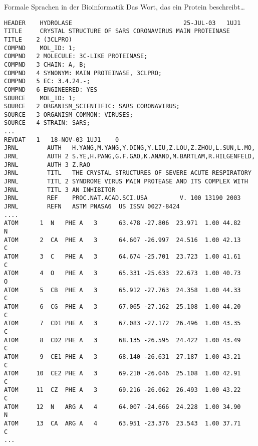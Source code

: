 \begin{frame}[fragile]{Formale Sprachen in der Bioinformatik}
  {Das Wort, das ein Protein beschreibt\dots}
\begin{verbatim}
HEADER    HYDROLASE                               25-JUL-03   1UJ1              
TITLE     CRYSTAL STRUCTURE OF SARS CORONAVIRUS MAIN PROTEINASE                 
TITLE    2 (3CLPRO)
COMPND    MOL_ID: 1;                                                            
COMPND   2 MOLECULE: 3C-LIKE PROTEINASE;                                        
COMPND   3 CHAIN: A, B;                                                         
COMPND   4 SYNONYM: MAIN PROTEINASE, 3CLPRO;                                    
COMPND   5 EC: 3.4.24.-;                                                        
COMPND   6 ENGINEERED: YES                                                      
SOURCE    MOL_ID: 1;                                                            
SOURCE   2 ORGANISM_SCIENTIFIC: SARS CORONAVIRUS;                               
SOURCE   3 ORGANISM_COMMON: VIRUSES;                                            
SOURCE   4 STRAIN: SARS;                                                        
...
REVDAT   1   18-NOV-03 1UJ1    0                                                
JRNL        AUTH   H.YANG,M.YANG,Y.DING,Y.LIU,Z.LOU,Z.ZHOU,L.SUN,L.MO,          
JRNL        AUTH 2 S.YE,H.PANG,G.F.GAO,K.ANAND,M.BARTLAM,R.HILGENFELD,          
JRNL        AUTH 3 Z.RAO                                                        
JRNL        TITL   THE CRYSTAL STRUCTURES OF SEVERE ACUTE RESPIRATORY           
JRNL        TITL 2 SYNDROME VIRUS MAIN PROTEASE AND ITS COMPLEX WITH            
JRNL        TITL 3 AN INHIBITOR                                                 
JRNL        REF    PROC.NAT.ACAD.SCI.USA         V. 100 13190 2003              
JRNL        REFN   ASTM PNASA6  US ISSN 0027-8424                               
....
ATOM      1  N   PHE A   3      63.478 -27.806  23.971  1.00 44.82           N  
ATOM      2  CA  PHE A   3      64.607 -26.997  24.516  1.00 42.13           C  
ATOM      3  C   PHE A   3      64.674 -25.701  23.723  1.00 41.61           C  
ATOM      4  O   PHE A   3      65.331 -25.633  22.673  1.00 40.73           O  
ATOM      5  CB  PHE A   3      65.912 -27.763  24.358  1.00 44.33           C  
ATOM      6  CG  PHE A   3      67.065 -27.162  25.108  1.00 44.20           C  
ATOM      7  CD1 PHE A   3      67.083 -27.172  26.496  1.00 43.35           C  
ATOM      8  CD2 PHE A   3      68.135 -26.595  24.422  1.00 43.49           C  
ATOM      9  CE1 PHE A   3      68.140 -26.631  27.187  1.00 43.21           C  
ATOM     10  CE2 PHE A   3      69.210 -26.046  25.108  1.00 42.91           C  
ATOM     11  CZ  PHE A   3      69.216 -26.062  26.493  1.00 43.22           C  
ATOM     12  N   ARG A   4      64.007 -24.666  24.228  1.00 34.90           N  
ATOM     13  CA  ARG A   4      63.951 -23.376  23.543  1.00 37.71           C  
...
\end{verbatim}
\end{frame}

